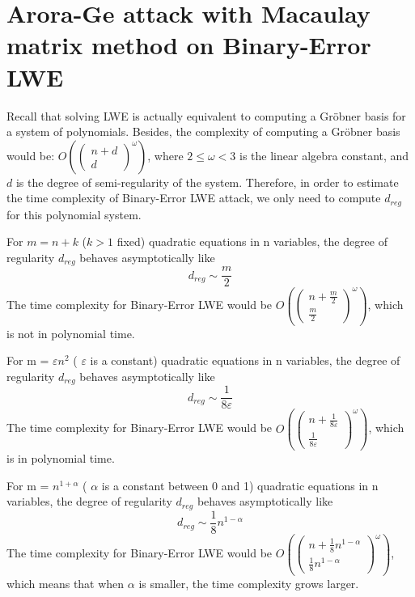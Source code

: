 \documentclass[a4paper]{article}
\theoremstyle{definition}
\theoremstyle{remark}
\renewcommand{\epsilon}{\varepsilon}
\begin{document}
\section{Arora-Ge attack with Macaulay matrix method on Binary-Error LWE}
Recall that solving LWE is actually equivalent to computing a Gr\"{o}bner basis\cite{albrecht2014algebraic} for a system of polynomials. Besides, the complexity of computing a Gr\"{o}bner basis would be:
$O \left( \left( \begin{array} { c } { n + d } \\ { d } \end{array} \right) ^ { \omega } \right)$,
where $2\le \omega < 3$ is the linear algebra constant, and $d$ is the degree of semi-regularity of the system. Therefore, in order to estimate the time complexity of Binary-Error LWE attack, we only need to compute $d_{reg}$ for this polynomial system.
\begin{theorem}\cite{bardet2005asymptotic}
For $m = n + k$ ($k > 1$ fixed) quadratic equations in n variables, the degree of
regularity $d_{reg}$ behaves asymptotically like
\begin{equation}
d _ { r e g } \sim \frac { m } { 2 }
\end{equation}
The time complexity for Binary-Error LWE would be
$O \left( \left( \begin{array} { c } { n + \frac { m } { 2 } } \\ { \frac { m } { 2 } } \end{array} \right) ^ { \omega } \right)$, which is not in polynomial time.
\end{theorem}
\begin{theorem}
For m = $\epsilon$$n^{2}$ ( $\epsilon$ is a constant) quadratic equations in n variables, the degree of
regularity $d_{reg}$ behaves asymptotically like
\begin{equation}
d _ { r e g } \sim \frac { 1 } { 8\epsilon }
\end{equation}
The time complexity for Binary-Error LWE would be
$O \left( \left( \begin{array} { c } { n + \frac { 1 } { 8\epsilon } } \\ { \frac { 1 } { 8\epsilon } } \end{array} \right) ^ { \omega } \right)$, which is in polynomial time.
\end{theorem}
\begin{theorem}
For m = $n^{1+\alpha}$ ( $\alpha$ is a constant between 0 and 1) quadratic equations in n variables, the degree of
regularity $d_{reg}$ behaves asymptotically like
\begin{equation}
d _ { r e g } \sim \frac { 1 } { 8  }n^{1 -\alpha}
\end{equation}
The time complexity for Binary-Error LWE would be
$O \left( \left( \begin{array} { c } { n + \frac { 1 } { 8  }n^{1 -\alpha} } \\ {\frac { 1 } { 8  }n^{1 -\alpha} } \end{array} \right) ^ { \omega } \right)$, which means that when $\alpha$ is smaller, the time complexity grows larger.
\end{theorem}
\end{document}
